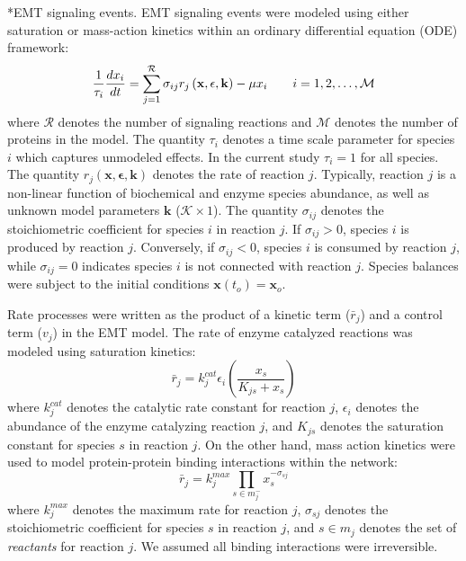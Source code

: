 \documentclass[12pt]{article}
\makeatletter
\renewcommand\subsubsection{\@startsection
	{subsubsection}{2}{0mm}
	{-0.05in}
	{-0.5\baselineskip}
	{\normalfont\normalsize\itshape}}
\makeatother
\begin{document}
\subsubsection*{EMT signaling events.}
EMT signaling events were modeled using either saturation or mass-action kinetics within an ordinary differential equation (ODE) framework:
\begin{equation}
	\frac{1}{\tau_{i}}\frac{dx_{i}}{dt}  =  \sum_{j = 1}^{\mathcal{R}}\sigma_{ij}r_{j}\left(\mathbf{x},\mathbf{\epsilon},\mathbf{k}\right)-\mu x_{i}\qquad{i=1,2,\hdots,\mathcal{M}}\\
\end{equation}
where $\mathcal{R}$ denotes the number of signaling reactions and $\mathcal{M}$ denotes the number of proteins in the model.
The quantity $\tau_{i}$ denotes a time scale parameter for species $i$ which captures unmodeled effects. In the current study $\tau_{i} = 1$ for all species.
The quantity $r_{j}\left(\mathbf{x},\mathbf{\epsilon},\mathbf{k}\right)$ denotes the rate of reaction $j$.
Typically, reaction $j$ is a non-linear function of biochemical and enzyme species abundance, as well as unknown model parameters $\mathbf{k}$ ($\mathcal{K}\times{1}$).
The quantity $\sigma_{ij}$ denotes the stoichiometric coefficient for species $i$ in reaction $j$.
If $\sigma_{ij}>0$, species $i$ is produced by reaction $j$.
Conversely, if $\sigma_{ij}<0$, species $i$ is consumed by reaction $j$, while $\sigma_{ij} = 0$ indicates species $i$ is not connected with reaction $j$.
Species balances were subject to the initial conditions $\mathbf{x}\left(t_{o}\right) = \mathbf{x}_{o}$.

Rate processes were written as the product of a kinetic term ($\bar{r}_{j}$) and a control term ($v_{j}$) in the EMT model.
The rate of enzyme catalyzed reactions was modeled using saturation kinetics:
\begin{equation}\label{eqn:rate-saturation}
	\bar{r}_{j} = k_{j}^{cat}\epsilon_{i}\left(\frac{x_{s}}{K_{js} + x_{s}}\right)
\end{equation}
where $k_{j}^{cat}$ denotes the catalytic rate constant for reaction $j$, $\epsilon_{i}$ denotes the abundance of the enzyme catalyzing reaction $j$,
and $K_{js}$ denotes the saturation constant for species $s$ in reaction $j$.
On the other hand, mass action kinetics were used to model protein-protein binding interactions within the network:
\begin{equation}\label{eqn:rate-action}
	\bar{r}_{j} = k_{j}^{max}\prod_{s\in{m_{j}^{-}}}x_{s}^{-\sigma_{sj}}
\end{equation}
where $k_{j}^{max}$ denotes the maximum rate for reaction $j$, $\sigma_{sj}$ denotes the stoichiometric coefficient for species $s$ in reaction $j$,
and $s\in{m_{j}}$ denotes the set of \textit{reactants} for reaction $j$. We assumed all binding interactions were irreversible.
\end{document}
